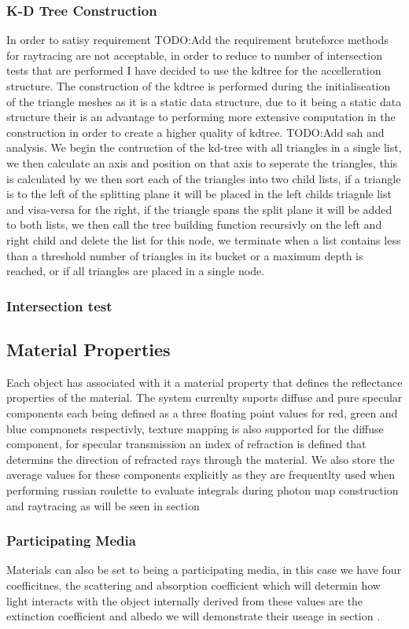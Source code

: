 \subsubsection{K-D Tree Construction}
In order to satisy requirement TODO:Add the requirement bruteforce methods for raytracing are not acceptable, in order to reduce
to number of intersection tests that are performed I have decided to use the kdtree for the accelleration structure. The
construction of the kdtree is performed during the initialiseation of the triangle meshes as it is a static data structure, due
to it being a static data structure their is an advantage to performing more extensive computation in the construction in
order to create a higher quality of kdtree. TODO:Add sah and analysis. We begin the contruction of the kd-tree with all
triangles in a single list, we then calculate an axis and position on that axis to seperate the triangles, this is calculated
by  we then sort each of the triangles into two child lists, if a triangle is
to the left of the splitting plane it will be placed in the left childs triagnle list and visa-versa for the right, if the
triangle spans the split plane it will be added to both lists, we then call the tree building function recursivly on the
left and right child and delete the list for this node, we terminate when a list contains less than a threshold number
of triangles in its bucket or a maximum depth is reached, or if all triangles are placed in a single node.

\subsubsection{Intersection test}


\subsection{Material Properties}
Each object has associated with it a material property that defines the reflectance properties of the material.
The system currenlty suports diffuse and pure specular components each being defined as a three floating point
values for red, green and blue compnonets respectivly, texture mapping is also supported for the diffuse component,
for specular transmission an index of refraction is defined that determins the direction of refracted rays through the
material. We also store the average values for these components explicitly as they are frequentlty used when performing
russian roulette to evaluate integrals during photon map construction and raytracing as will be seen in section 

\subsubsection{Participating Media}
Materials can also be set to being a participating media, in this case we have four coefficitnes, the scattering and
absorption coefficient which will determin how light interacts with the object internally derived from these values
are the extinction coefficient and albedo we will demonstrate their useage in section .


